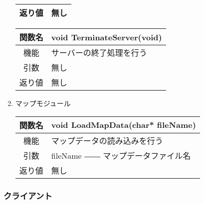 \documentclass{jarticle}
\begin{document}
\begin{enumerate}
\begin{table}[H]
\begin{center}
\begin{tabular}{|c||p{30em}|}
                返り値&無し\\\hline
            \end{tabular}
        \end{center}
    \end{table}
    \begin{table}[H]
        \label{table:fanc_s1-4}
        \begin{center}
            \begin{tabular}{|c||p{30em}|}\hline
                関数名&void TerminateServer(void)  \\\hline
                機能&サーバーの終了処理を行う\\
                引数&無し\\
                返り値&無し\\\hline
            \end{tabular}
        \end{center}
    \end{table}
    \item マップモジュール
    \begin{table}[H]
        \label{table:fanc_s2-1}
        \begin{center}
            \begin{tabular}{|c||p{30em}|}\hline
                関数名&void LoadMapData(char* fileName)\\\hline
                機能&マップデータの読み込みを行う\\
                引数&fileName ―― マップデータファイル名\\
                返り値&無し\\\hline
            \end{tabular}
        \end{center}
    \end{table}
\end{enumerate}

\subsubsection{クライアント}
\end{document}
